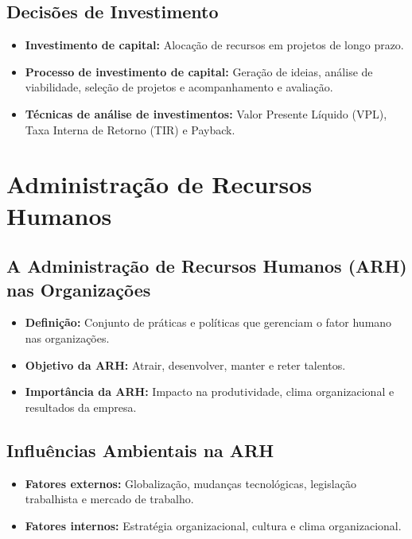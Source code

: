 \documentclass{article}
\begin{document}
\subsection{Decisões de Investimento}
\begin{itemize}
    \item \textbf{Investimento de capital:} Alocação de recursos em projetos de longo prazo. 
    \item \textbf{Processo de investimento de capital:} Geração de ideias, análise de viabilidade, seleção de projetos e acompanhamento e avaliação. 
    \item \textbf{Técnicas de análise de investimentos:} Valor Presente Líquido (VPL), Taxa Interna de Retorno (TIR) e Payback. 
\end{itemize}


\section{Administração de Recursos Humanos}

\subsection{A Administração de Recursos Humanos (ARH) nas Organizações}
\begin{itemize}
    \item \textbf{Definição:} Conjunto de práticas e políticas que gerenciam o fator humano nas organizações. 
    \item \textbf{Objetivo da ARH:} Atrair, desenvolver, manter e reter talentos. 
    \item \textbf{Importância da ARH:} Impacto na produtividade, clima organizacional e resultados da empresa. 
\end{itemize}

\subsection{Influências Ambientais na ARH}
\begin{itemize}
    \item \textbf{Fatores externos:} Globalização, mudanças tecnológicas, legislação trabalhista e mercado de trabalho. 
    \item \textbf{Fatores internos:} Estratégia organizacional, cultura e clima organizacional. 
\end{itemize}
\end{document}
